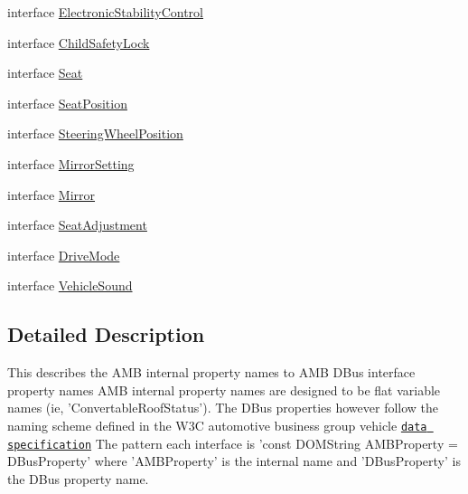 \begin{DoxyCompactItemize}
\item 
interface \hyperlink{interfaceElectronicStabilityControl}{Electronic\+Stability\+Control}
\item 
interface \hyperlink{interfaceChildSafetyLock}{Child\+Safety\+Lock}
\item 
interface \hyperlink{interfaceSeat}{Seat}
\item 
interface \hyperlink{interfaceSeatPosition}{Seat\+Position}
\item 
interface \hyperlink{interfaceSteeringWheelPosition}{Steering\+Wheel\+Position}
\item 
interface \hyperlink{interfaceMirrorSetting}{Mirror\+Setting}
\item 
interface \hyperlink{interfaceMirror}{Mirror}
\item 
interface \hyperlink{interfaceSeatAdjustment}{Seat\+Adjustment}
\item 
interface \hyperlink{interfaceDriveMode}{Drive\+Mode}
\item 
interface \hyperlink{interfaceVehicleSound}{Vehicle\+Sound}
\end{DoxyCompactItemize}


\subsection{Detailed Description}
This describes the A\+M\+B internal property names to A\+M\+B D\+Bus interface property names A\+M\+B internal property names are designed to be flat variable names (ie, 'Convertable\+Roof\+Status'). The D\+Bus properties however follow the naming scheme defined in the W3\+C automotive business group vehicle \href{http://w3c.github.io/automotive-bg/data_spec.html}{\tt data specification} The pattern each interface is 'const D\+O\+M\+String A\+M\+B\+Property = D\+Bus\+Property' where 'A\+M\+B\+Property' is the internal name and 'D\+Bus\+Property' is the D\+Bus property name. 


